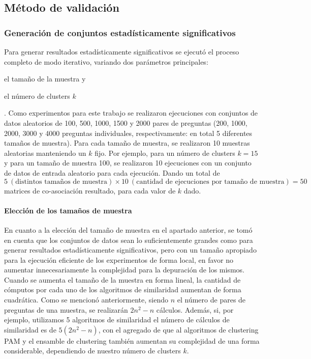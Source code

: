 \subsection{Método de validación}\label{metodo-validacion}

\subsubsection{Generación de conjuntos estadísticamente significativos}

Para generar resultados estadísticamente significativos se ejecutó el proceso completo de modo iterativo, variando dos parámetros principales: \begin{enumerate*} [label=(\roman*)] \item el tamaño de la muestra y \item el número de clusters \(k\)\end{enumerate*}. Como experimentos para este trabajo se realizaron ejecuciones con conjuntos de datos aleatorios de 100, 500, 1000, 1500 y 2000 pares de preguntas (200, 1000, 2000, 3000 y 4000 preguntas individuales, respectivamente: en total 5 diferentes tamaños de muestra). Para cada tamaño de muestra, se realizaron 10 muestras aleatorias manteniendo un \(k\) fijo. Por ejemplo, para un número de clusters \(k = 15\) y para un tamaño de muestra 100, se realizaron 10 ejecuciones con un conjunto de datos de entrada aleatorio para cada ejecución. Dando un total de \(5 \: (\text{distintos tamaños de muestra}) \times 10 \: (\text{cantidad de ejecuciones por tamaño de muestra}) = 50\) matrices de co-asociación resultado, para cada valor de \(k\) dado.

\paragraph{Elección de los tamaños de muestra}
En cuanto a la elección del tamaño de muestra en el apartado anterior, se tomó en cuenta que los conjuntos de datos sean lo suficientemente grandes como para generar resultados estadísticamente significativos, pero con un tamaño apropiado para la ejecución eficiente de los experimentos de forma local, en favor no aumentar innecesariamente la complejidad para la depuración de los mismos. Cuando se aumenta el tamaño de la muestra en forma lineal, la cantidad de cómputos por cada uno de los algoritmos de similaridad aumentan de forma cuadrática. Como se mencionó anteriormente, siendo \(n\) el número de pares de preguntas de una muestra, se realizarán \(2n^2-n\) cálculos. Además, si, por ejemplo, utilizamos 5 algoritmos de similaridad el número de cálculos de similaridad es de \(5(2n^2-n)\), con el agregado de que al algoritmos de clustering PAM y el ensamble de clustering también aumentan su complejidad de una forma considerable, dependiendo de nuestro número de clusters \(k\).


